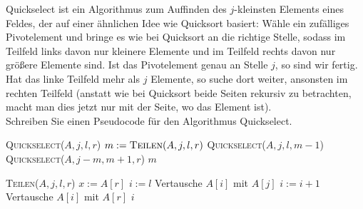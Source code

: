 
\begin{exercise}

Quickselect ist ein Algorithmus zum Auffinden des $j$-kleinsten Elements eines
Feldes, der auf einer ähnlichen Idee wie Quicksort basiert: Wähle ein zufälliges
Pivotelement und bringe es wie bei Quicksort an die richtige Stelle, sodass im
Teilfeld links davon nur kleinere Elemente und im Teilfeld rechts davon nur
größere Elemente sind. Ist das Pivotelement genau an
Stelle $j$, so sind wir fertig. Hat das linke Teilfeld mehr als $j$ Elemente,
so suche dort weiter, ansonsten im rechten Teilfeld (anstatt wie bei Quicksort beide
Seiten rekursiv zu betrachten, macht man dies jetzt nur mit der Seite, wo das Element ist). \\
Schreiben Sie einen Pseudocode für den Algorithmus Quickselect.

\end{exercise}



\begin{solution}

\phantom{}

\begin{algorithmic}[1]
  \State \textsc{Quickselect}($A,j,l,r$)
    \State $m := \textsc{Teilen}(A,j,l,r)$
      \State \textsc{Quickselect}($A,j,l,m-1$)
      \State \textsc{Quickselect}($A,j-m,m+1,r$)
      \State \Return $m$
    \EndIf
  \EndIf
\end{algorithmic}

\begin{algorithmic}[1]
  \State \textsc{Teilen}($A,j,l,r$)
  \State $x := A[r]$
  \State $i := l$
      \State Vertausche $A[i]$ mit $A[j]$
      \State $i := i + 1$
    \EndIf
  \EndFor
  \State Vertausche $A[i]$ mit $A[r]$
  \State \Return $i$
\end{algorithmic}

\end{solution}
